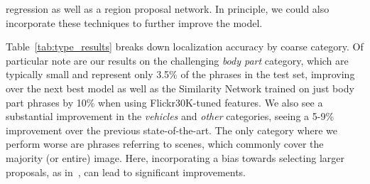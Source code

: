 \documentclass[runningheads]{llncs}
\begin{document}
regression as well as a region proposal network. In principle, we could also incorporate these techniques to further improve the model.

Table~\ref{tab:type_results} breaks down localization accuracy by coarse category.  Of particular note are our results on the challenging {\em body part} category, which are typically small and represent only 3.5\% of the phrases in the test set, improving over the next best model as well as the Similarity Network trained on just body part phrases by 10\% when using Flickr30K-tuned features.  We also see a substantial improvement in the {\em vehicles} and {\em other} categories, seeing a 5-9\% improvement over the previous state-of-the-art.  The only category where we perform worse are phrases referring to scenes, which commonly cover the majority (or entire) image. Here, incorporating a bias towards selecting larger proposals, as in~\cite{flickrentitiesijcv,plummerPLCLC2017}, can lead to significant improvements.
\end{document}
